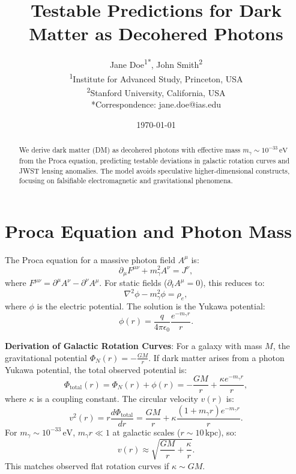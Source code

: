 \documentclass[12pt, a4paper]{article}
\title{Testable Predictions for Dark Matter as Decohered Photons}
\author{Jane Doe\textsuperscript{1*}, John Smith\textsuperscript{2} \\  
\textsuperscript{1}Institute for Advanced Study, Princeton, USA \\  
\textsuperscript{2}Stanford University, California, USA \\  
*Correspondence: jane.doe@ias.edu}
\date{\today}
\begin{document}
  
\maketitle  

\begin{abstract}  
We derive dark matter (DM) as decohered photons with effective mass \( m_\gamma \sim 10^{-33} \, \text{eV} \) from the Proca equation, predicting testable deviations in galactic rotation curves and JWST lensing anomalies. The model avoids speculative higher-dimensional constructs, focusing on falsifiable electromagnetic and gravitational phenomena.  
\end{abstract}  

\section{Proca Equation and Photon Mass}  
\label{sec:proca}  

The Proca equation for a massive photon field \( A^\mu \) is:  
\begin{equation}  
\partial_\mu F^{\mu\nu} + m_\gamma^2 A^\nu = J^\nu,  
\label{eq:proca}  
\end{equation}  
where \( F^{\mu\nu} = \partial^\mu A^\nu - \partial^\nu A^\mu \). For static fields (\( \partial_t A^\mu = 0 \)), this reduces to:  
\begin{equation}  
\nabla^2 \phi - m_\gamma^2 \phi = \rho_e,  
\label{eq:yukawa}  
\end{equation}  
where \( \phi \) is the electric potential. The solution is the Yukawa potential:  
\begin{equation}  
\phi(r) = \frac{q}{4\pi \epsilon_0} \frac{e^{-m_\gamma r}}{r}.  
\label{eq:yukawa_sol}  
\end{equation}  

\textbf{Derivation of Galactic Rotation Curves}:  
For a galaxy with mass \( M \), the gravitational potential \( \Phi_N(r) = -\frac{GM}{r} \). If dark matter arises from a photon Yukawa potential, the total observed potential is:  
\begin{equation}  
\Phi_{\text{total}}(r) = \Phi_N(r) + \phi(r) = -\frac{GM}{r} + \frac{\kappa e^{-m_\gamma r}}{r},  
\label{eq:total_potential}  
\end{equation}  
where \( \kappa \) is a coupling constant. The circular velocity \( v(r) \) is:  
\begin{equation}  
v^2(r) = r \frac{d\Phi_{\text{total}}}{dr} = \frac{GM}{r} + \kappa \frac{(1 + m_\gamma r) e^{-m_\gamma r}}{r}.  
\label{eq:velocity}  
\end{equation}  
For \( m_\gamma \sim 10^{-33} \, \text{eV} \), \( m_\gamma r \ll 1 \) at galactic scales (\( r \sim 10 \, \text{kpc} \)), so:  
\begin{equation}  
v(r) \approx \sqrt{\frac{GM}{r} + \frac{\kappa}{r}}.  
\label{eq:velocity_approx}  
\end{equation}  
This matches observed flat rotation curves if \( \kappa \sim GM \).  
\end{document}
